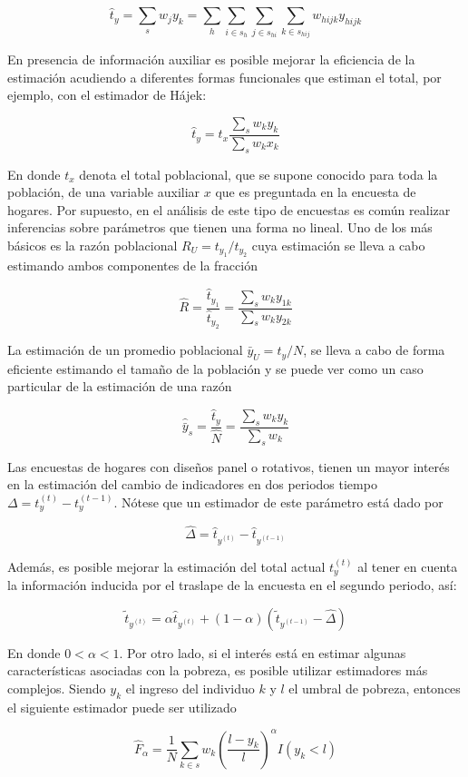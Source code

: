 \documentclass[
  12pt,
  spanish,
]{book}
\begin{document}
\[
\hat{t}_y = \sum_s w_j y_k = \sum_h \sum_{i \in s_h} \sum_{j \in s_{hi}} \sum_{k \in s_{hij}} w_{hijk} y_{hijk}
\]

En presencia de información auxiliar es posible mejorar la eficiencia de la estimación acudiendo a diferentes formas funcionales que estiman el total, por ejemplo, con el estimador de Hájek:

\[
\hat{t}_y = t_x \frac{\sum_s w_k y_k}{\sum_s w_k x_k}
\]

En donde \(t_x\) denota el total poblacional, que se supone conocido para toda la población, de una variable auxiliar \(x\) que es preguntada en la encuesta de hogares. Por supuesto, en el análisis de este tipo de encuestas es común realizar inferencias sobre parámetros que tienen una forma no lineal. Uno de los más básicos es la razón poblacional \(R_U = t_{y_1} / t_{y_2}\) cuya estimación se lleva a cabo estimando ambos componentes de la fracción

\[
\hat{R}= \frac{\hat{t}_{y_1}}{\hat{t}_{y_2}}
= \frac{\sum_s w_k y_{1k}} {\sum_s w_k y_{2k}}
\]

La estimación de un promedio poblacional \(\bar{y}_U = t_y / N\), se lleva a cabo de forma eficiente estimando el tamaño de la población y se puede ver como un caso particular de la estimación de una razón

\[
\hat{\bar{y}}_s= \frac{\hat{t}_y}{\hat{N}} 
= \frac{\sum_s w_k y_k}{\sum_s w_k}
\]

Las encuestas de hogares con diseños panel o rotativos, tienen un mayor interés en la estimación del cambio de indicadores en dos periodos tiempo \(\Delta = t_y^{(t)} - t_y^{(t-1)}\). Nótese que un estimador de este parámetro está dado por

\[
\hat{\Delta} = \hat{t}_{y^{(t)}} - \hat{t}_{y^{(t-1)}}
\]

Además, es posible mejorar la estimación del total actual \(t_y^{(t)}\) al tener en cuenta la información inducida por el traslape de la encuesta en el segundo periodo, así:

\[
\tilde{t}_{y^{(t)}} = \alpha \hat{t}_{y^{(t)}} 
+ (1 -\alpha) (\tilde{t}_{y^{(t-1)}} - \hat{\Delta})
\]

En donde \(0 < \alpha < 1\). Por otro lado, si el interés está en estimar algunas características asociadas con la pobreza, es posible utilizar estimadores más complejos. Siendo \(y_k\) el ingreso del individuo \(k\) y \(l\) el umbral de pobreza, entonces el siguiente estimador puede ser utilizado

\[
\hat{F}_{\alpha}=\frac{1}{N}\sum_{k\in s} w_k 
\left(\frac{l-y_k}{l}\right)^{\alpha}I(y_k<l)
\]
\end{document}

